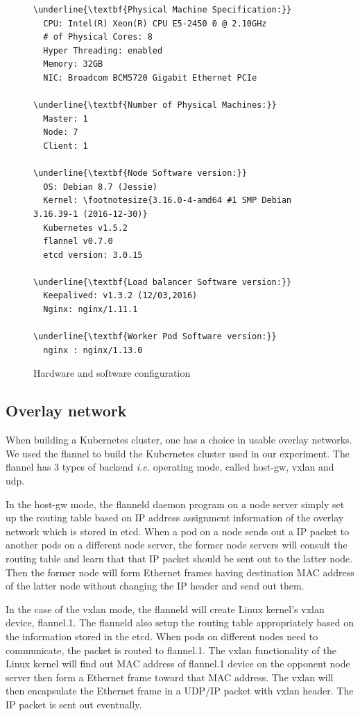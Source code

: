 \begin{figure}
\begin{minipage}{0.9\columnwidth}
\small
\begin{Verbatim}[commandchars=\\\{\}]
\underline{\textbf{Physical Machine Specification:}}
  CPU: Intel(R) Xeon(R) CPU E5-2450 0 @ 2.10GHz
  # of Physical Cores: 8
  Hyper Threading: enabled
  Memory: 32GB
  NIC: Broadcom BCM5720 Gigabit Ethernet PCIe

\underline{\textbf{Number of Physical Machines:}}
  Master: 1
  Node: 7
  Client: 1

\underline{\textbf{Node Software version:}}
  OS: Debian 8.7 (Jessie)
  Kernel: \footnotesize{3.16.0-4-amd64 #1 SMP Debian 3.16.39-1 (2016-12-30)}
  Kubernetes v1.5.2
  flannel v0.7.0
  etcd version: 3.0.15

\underline{\textbf{Load balancer Software version:}}
  Keepalived: v1.3.2 (12/03,2016)
  Nginx: nginx/1.11.1

\underline{\textbf{Worker Pod Software version:}}
  nginx : nginx/1.13.0 
\end{Verbatim}
\end{minipage}
\caption{Hardware and software configuration}
\label{fig:Hardware and software configuration}
\end{figure}


\subsection{Overlay network}

When building a Kubernetes cluster, one has a choice in usable overlay networks.
We used the flannel to build the Kubernetes cluster used in our experiment. 
The flannel has 3 types of backend {\it i.e.} operating mode, called host-gw, vxlan and udp\cite{CoreOSFlannelBackend}.

In the host-gw mode, the flanneld daemon program on a node server simply set up the routing table 
based on IP address assignment information of the overlay network which is stored in etcd. 
When a pod on a node sends out a IP packet to another pods on a different node server, 
the former node servers will consult the routing table and learn that that IP packet should be sent out to the latter node.
Then the former node will form Ethernet frames having destination MAC address of the latter node without changing the IP header and send out them.

In the case of the vxlan mode, the flanneld will create Linux kernel's vxlan device, flannel.1. 
The flanneld also setup the routing table appropriately based on the information stored in the etcd.
When pods on different nodes need to communicate, the packet is routed to flannel.1.
The vxlan functionality of the Linux kernel will find out MAC address of flannel.1 device on the opponent node server 
then form a Ethernet frame toward that MAC address.
The vxlan will then encapsulate the Ethernet frame in a UDP/IP packet with vxlan header.
The IP packet is sent out eventually.

